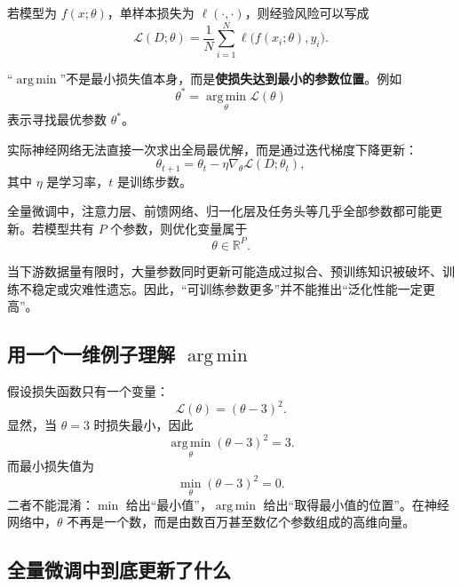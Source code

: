 \documentclass[UTF8,12pt,a4paper,fontset=none]{ctexart}
\newcommand{\Loss}{\mathcal{L}}
\newcommand{\R}{\mathbb{R}}
\newcommand{\argmin}{\operatorname*{arg\,min}}
\begin{document}
若模型为 $f(x;\theta)$，单样本损失为 $\ell(\cdot,\cdot)$，则经验风险可以写成
\begin{equation}
 \Loss(D;\theta)
 =\frac{1}{N}\sum_{i=1}^{N}
 \ell\bigl(f(x_i;\theta),y_i\bigr).
\end{equation}

“$\argmin$”不是最小损失值本身，而是\textbf{使损失达到最小的参数位置}。例如
\begin{equation}
 \theta^\ast=\argmin_{\theta}\Loss(\theta)
\end{equation}
表示寻找最优参数 $\theta^\ast$。

实际神经网络无法直接一次求出全局最优解，而是通过迭代梯度下降更新：
\begin{equation}
 \theta_{t+1}
 =\theta_t-\eta\nabla_{\theta}\Loss(D;\theta_t),
\end{equation}
其中 $\eta$ 是学习率，$t$ 是训练步数。

全量微调中，注意力层、前馈网络、归一化层及任务头等几乎全部参数都可能更新。若模型共有 $P$ 个参数，则优化变量属于
\begin{equation}
 \theta\in\R^P.
\end{equation}

\begin{notebox}[全量微调不一定更好]
当下游数据量有限时，大量参数同时更新可能造成过拟合、预训练知识被破坏、训练不稳定或灾难性遗忘。因此，“可训练参数更多”并不能推出“泛化性能一定更高”。
\end{notebox}



\subsection{用一个一维例子理解 \texorpdfstring{$\argmin$}{argmin}}

假设损失函数只有一个变量：
\begin{equation}
 \Loss(\theta)=(\theta-3)^2.
\end{equation}
显然，当 $\theta=3$ 时损失最小，因此
\begin{equation}
 \argmin_{\theta}(\theta-3)^2=3.
\end{equation}
而最小损失值为
\begin{equation}
 \min_{\theta}(\theta-3)^2=0.
\end{equation}
二者不能混淆：$\min$ 给出“最小值”，$\argmin$ 给出“取得最小值的位置”。在神经网络中，$\theta$ 不再是一个数，而是由数百万甚至数亿个参数组成的高维向量。

\subsection{全量微调中到底更新了什么}
\end{document}
